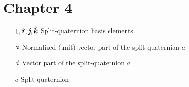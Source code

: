 \section*{Chapter 4}
\begin{itemize}[itemsep=0pt, leftmargin=2cm, labelsep=0cm, labelwidth=1.9cm, align=left]
%
    \item[$1,\quati,\quatj,\quatk$] Split-quaternion basis elements
    \item[$\uvec{a}$] Normalized (unit) vector part of the split-quaternion \(a\)
    \item[$\vec{a}$] Vector part of the split-quaternion \(a\)
    \item[$a$] Split-quaternion
%
%
%
\end{itemize}